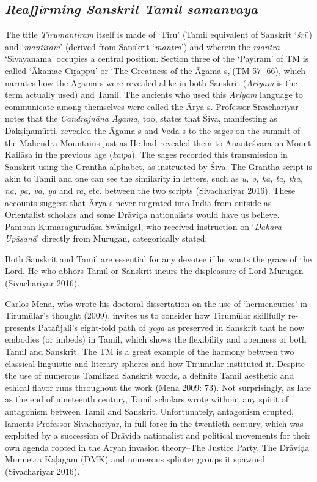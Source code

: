\subsection*{\textit{Reaffirming Sanskrit Tamil samanvaya}}

The title \textit{Tirumantiram} itself is made of ‘Tiru’ (Tamil equivalent of Sanskrit ‘\textit{śrī}’) and ‘\textit{mantiram}’ (derived from Sanskrit ‘\textit{mantra}’) and wherein the \textit{mantra} ‘Sivayanama’ occupies a central position. Section three of the ‘Payiram’ of TM is called ‘Ākamac Ciṟappu’ or ‘The Greatness of the Āgama-s,’(TM 57- 66), which narrates how the Āgama-s were revealed alike in both Sanskrit (\textit{Ariyam} is the term actually used) and Tamil. The ancients who used this \textit{Ariyam} language to communicate among themselves were called the Ārya-s. Professor Sivachariyar notes that the \textit{Candrajnāna Āgama,} too, states that Śiva, manifesting as Dakṣiṇamūrti, revealed the Āgama-s and Veda-s to the sages on the summit of the Mahendra Mountains just as He had revealed them to Ananteśvara on Mount Kailāsa in the previous age (\textit{kalpa}). The sages recorded this transmission in Sanskrit using the Grantha alphabet, as instructed by Śiva. The Grantha script is akin to Tamil and one can see the similarity in letters, such as \textit{u, o, ka, ta, tha, na, pa, va, ya} and \textit{ra}, etc. between the two scripts (Sivachariyar 2016). These accounts suggest that Ārya-s never migrated into India from outside as Orientalist scholars and some Drāviḍa nationalists would have us believe. Pamban Kumaragurudāsa Swāmigal, who received instruction on ‘\textit{Dahara Upāsanā}’ directly from Murugan, categorically stated:

\begin{myquote}
Both Sanskrit and Tamil are essential for any devotee if he wants the grace of the Lord. He who abhors Tamil or Sanskrit incurs the displeasure of Lord Murugan (Sivachariyar 2016).
\end{myquote}

Carlos Mena, who wrote his doctoral dissertation on the use of ‘hermeneutics’ in Tirumūlar’s thought (2009), invites us to consider how Tirumūlar skillfully re-presents Patañjali’s eight-fold path of \textit{yoga} as preserved in Sanskrit that he now embodies (or imbeds) in Tamil, which shows the flexibility and openness of both Tamil and Sanskrit. The TM is a great example of the harmony between two classical linguistic and literary spheres and how Tirumūlar instituted it. Despite the use of numerous Tamilized Sanskrit words, a definite Tamil aesthetic and ethical flavor runs throughout the work (Mena 2009: 73). Not surprisingly, as late as the end of nineteenth century, Tamil scholars wrote without any spirit of antagonism between Tamil and Sanskrit. Unfortunately, antagonism erupted, laments Professor Sivachariyar, in full force in the twentieth century, which was exploited by a succession of Drāviḍa nationalist and political movements for their own agenda rooted in the Aryan invasion theory--The Justice Party, The Drāviḍa Munnetra Kaļagam (DMK) and numerous splinter groups it spawned (Sivachariyar 2016).


